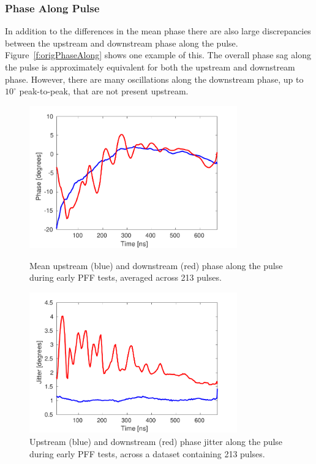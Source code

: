 \subsubsection{Phase Along Pulse}

In addition to the differences in the mean phase there are also large discrepancies between the upstream and downstream phase along the pulse. Figure~\ref{f:origPhaseAlong} shows one example of this. The overall phase sag along the pulse is approximately equivalent for both the upstream and downstream phase. However, there are many oscillations along the downstream phase, up to \(10^\circ\) peak-to-peak, that are not present upstream.

\begin{figure}
  \centering
  \includegraphics[width=0.8\textwidth]{Figures/propagation/origPhaseAlong}
  \caption{Mean upstream (blue) and downstream (red) phase along the pulse during early PFF tests, averaged across 213 pulses.}
  \label{f:origPhaseAlong}
  \includegraphics[width=0.8\textwidth]{Figures/propagation/origJitterAlong}
  \caption{Upstream (blue) and downstream (red) phase jitter along the pulse during early PFF tests, across a dataset containing 213 pulses.}
  \label{f:origJitterAlong}
\end{figure}

